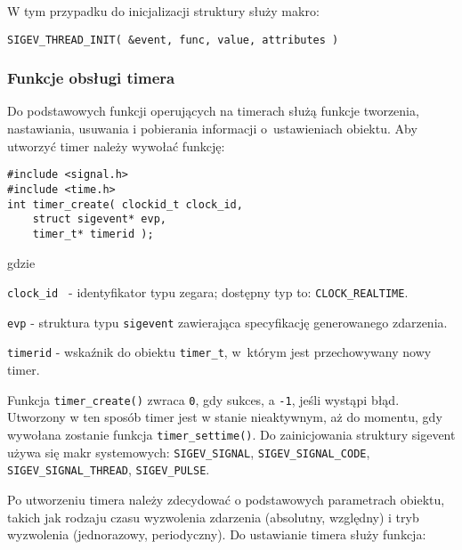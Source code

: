 W tym przypadku do inicjalizacji struktury służy makro:

\begin{lstlisting}[style=MyCStyle]
SIGEV_THREAD_INIT( &event, func, value, attributes )
\end{lstlisting}

\subsubsection{Funkcje obsługi timera}

Do podstawowych funkcji operujących na timerach służą funkcje tworzenia, nastawiania, usuwania i pobierania informacji o~ustawieniach obiektu. Aby utworzyć timer należy wywołać funkcję:

\begin{lstlisting}[style=MyCStyle]
#include <signal.h>
#include <time.h>
int timer_create( clockid_t clock_id,
	struct sigevent* evp,
	timer_t* timerid );
\end{lstlisting}

\noindent
gdzie

\begin{myitemize}
\item[] \lstinline[style=MyCStyle]{clock_id } - identyfikator typu zegara; dostępny typ to: \lstinline[style=MyCStyle]{CLOCK_REALTIME}.
\item[] \lstinline[style=MyCStyle]{evp} - struktura typu \lstinline[style=MyCStyle]{sigevent} zawierająca specyfikację generowanego zdarzenia.
\item[] \lstinline[style=MyCStyle]{timerid} - wskaźnik do obiektu \lstinline[style=MyCStyle]{timer_t}, w~którym jest przechowywany nowy timer.
\end{myitemize}

Funkcja \lstinline[style=MyCStyle]{timer_create()} zwraca \lstinline[style=MyCStyle]{0}, gdy sukces, a \lstinline[style=MyCStyle]{-1}, jeśli wystąpi błąd. Utworzony w ten sposób timer jest w stanie nieaktywnym, aż do momentu, gdy wywołana zostanie funkcja \lstinline[style=MyCStyle]{timer_settime()}. Do zainicjowania struktury sigevent używa się makr systemowych: \lstinline[style=MyCStyle]{SIGEV_SIGNAL}, \lstinline[style=MyCStyle]{SIGEV_SIGNAL_CODE}, \lstinline[style=MyCStyle]{SIGEV_SIGNAL_THREAD}, \lstinline[style=MyCStyle]{SIGEV_PULSE}.

Po utworzeniu timera należy zdecydować o podstawowych parametrach obiektu, takich jak rodzaju czasu wyzwolenia zdarzenia (absolutny, względny) i tryb wyzwolenia (jednorazowy, periodyczny). Do ustawianie timera służy funkcja:

